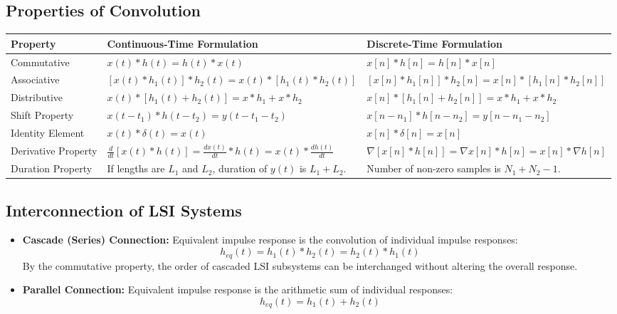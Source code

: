 \documentclass[12pt,a4paper]{article}
\renewcommand{\arraystretch}{1.45}
\begin{document}
\subsection{Properties of Convolution}

\par\vspace{6pt}\noindent
\begingroup
\setlength{\tabcolsep}{5pt}
\setlength{\extrarowheight}{3pt}
\renewcommand{\arraystretch}{1.4}
\begin{tabularx}{\linewidth}{|B{3.8cm}|Y|Y|}
\hline
\textbf{Property} & \textbf{Continuous-Time Formulation} & \textbf{Discrete-Time Formulation} \\
\hline
Commutative & $x(t) * h(t) = h(t) * x(t)$ & $x[n] * h[n] = h[n] * x[n]$ \\
\hline
Associative & $[x(t) * h_1(t)] * h_2(t) = x(t) * [h_1(t) * h_2(t)]$ & $[x[n] * h_1[n]] * h_2[n] = x[n] * [h_1[n] * h_2[n]]$ \\
\hline
Distributive & $x(t) * [h_1(t) + h_2(t)] = x * h_1 + x * h_2$ & $x[n] * [h_1[n] + h_2[n]] = x * h_1 + x * h_2$ \\
\hline
Shift Property & $x(t - t_1) * h(t - t_2) = y(t - t_1 - t_2)$ & $x[n - n_1] * h[n - n_2] = y[n - n_1 - n_2]$ \\
\hline
Identity Element & $x(t) * \delta(t) = x(t)$ & $x[n] * \delta[n] = x[n]$ \\
\hline
Derivative Property & $\frac{d}{dt}[x(t) * h(t)] = \frac{dx(t)}{dt} * h(t) = x(t) * \frac{dh(t)}{dt}$ & $\nabla[x[n] * h[n]] = \nabla x[n] * h[n] = x[n] * \nabla h[n]$ \\
\hline
Duration Property & If lengths are $L_1$ and $L_2$, duration of $y(t)$ is $L_1 + L_2$. & Number of non-zero samples is $N_1 + N_2 - 1$. \\
\hline
\end{tabularx}
\endgroup

\subsection{Interconnection of LSI Systems}
\begin{itemize}[topsep=2pt, itemsep=3pt]
  \item \textbf{Cascade (Series) Connection:} Equivalent impulse response is the convolution of individual impulse responses:
  \begin{equation}
    h_{eq}(t) = h_1(t) * h_2(t) = h_2(t) * h_1(t)
  \end{equation}
  By the commutative property, the order of cascaded LSI subsystems can be interchanged without altering the overall response.
  \item \textbf{Parallel Connection:} Equivalent impulse response is the arithmetic sum of individual responses:
  \begin{equation}
    h_{eq}(t) = h_1(t) + h_2(t)
  \end{equation}
\end{itemize}
\end{document}
